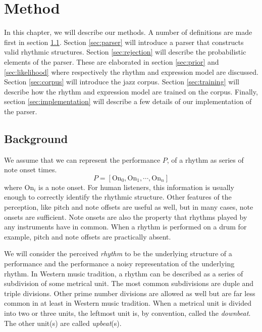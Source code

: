 \chapter{Method}
\label{sec:method}

In this chapter, we will describe our methods. A number of definitions are made first in section \ref{sec:definitions}. Section \ref{sec:parser} will introduce a parser that constructs valid rhythmic structures. Section \ref{sec:rejection} will describe the probabilistic elements of the parser. These are elaborated in section \ref{sec:prior} and \ref{sec:likelihood} where respectively the rhythm and expression model are discussed. Section \ref{sec:corpus} will introduce the jazz corpus. Section \ref{sec:training} will describe how the rhythm and expression model are trained on the corpus. Finally, section \ref{sec:implementation} will describe a few details of our implementation of the parser.

\section{Background}
\label{sec:definitions}

We assume that we can represent the performance $P$, of a rhythm as series of note onset times. 
\begin{equation}
\label{eq:performance}
P = [\mathrm{On}_0, \mathrm{On}_1, \cdots, \mathrm{On}_n]
\end{equation}
where $\mathrm{On}_i$ is a note onset. For human listeners, this information is usually enough to correctly identify the rhythmic structure. Other features of the perception, like pitch and note offsets are useful as well, but in many cases, note onsets are sufficient. Note onsets are also the property that rhythms played by any instruments have in common. When a rhythm is performed on a drum for example, pitch and note offsets are practically absent.

We will consider the perceived \textit{rhythm} to be the underlying structure of a performance and the performance a noisy representation of the underlying rhythm. In Western music tradition, a rhythm can be described as a series of subdivision of some metrical unit. The most common subdivisions are duple and triple divisions. Other prime number divisions are allowed as well but are far less common in at least in Western music tradition. When a metrical unit is divided into two or three units, the leftmost unit is, by convention, called the \textit{downbeat}. The other unit(s) are called \textit{upbeat}(s).

